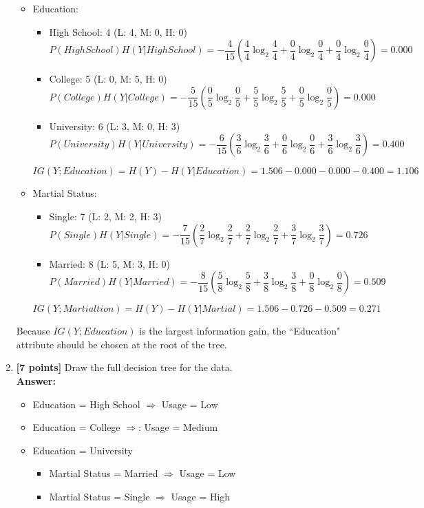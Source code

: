 \begin{enumerate}
\begin{itemize}
	\item Education:
	\begin{itemize}
		\item High School: 4 (L: 4, M: 0, H: 0)
		$$P(High School)H(Y|High School)=-\frac{4}{15}(\frac{4}{4}\log_2\frac{4}{4}+\frac{0}{4}\log_2\frac{0}{4}+\frac{0}{4}\log_2\frac{0}{4})=0.000$$
		\item College: 5 (L: 0, M: 5, H: 0)
		$$P(College)H(Y|College)=-\frac{5}{15}(\frac{0}{5}\log_2\frac{0}{5}+\frac{5}{5}\log_2\frac{5}{5}+\frac{0}{5}\log_2\frac{0}{5})=0.000$$
		\item University: 6 (L: 3, M: 0, H: 3)
		$$P(University)H(Y|University)=-\frac{6}{15}(\frac{3}{6}\log_2\frac{3}{6}+\frac{0}{6}\log_2\frac{0}{6}+\frac{3}{6}\log_2\frac{3}{6})=0.400$$
	\end{itemize}
	$$IG(Y;Education)=H(Y)-H(Y|Education)=1.506-0.000-0.000-0.400=1.106$$
	\item Martial Status:
	\begin{itemize}
		\item Single: 7 (L: 2, M: 2, H: 3)
		$$P(Single)H(Y|Single)=-\frac{7}{15}(\frac{2}{7}\log_2\frac{2}{7}+\frac{2}{7}\log_2\frac{2}{7}+\frac{3}{7}\log_2\frac{3}{7})=0.726$$
		\item Married: 8 (L: 5, M: 3, H: 0)
		$$P(Married)H(Y|Married)=-\frac{8}{15}(\frac{5}{8}\log_2\frac{5}{8}+\frac{3}{8}\log_2\frac{3}{8}+\frac{0}{8}\log_2\frac{0}{8})=0.509$$
	\end{itemize}
	$$IG(Y;Martialtion)=H(Y)-H(Y|Martial)=1.506-0.726-0.509=0.271$$
\end{itemize}
Because $IG(Y;Education)$ is the largest information gain, the ``Education" attribute should be chosen at the root of the tree.

\item\textbf{[7 points]} Draw the full decision tree for the data.
\\\textbf{Answer:}\\
\begin{itemize}
	\item Education = High School $\Rightarrow$ Usage = Low
	\item Education = College $\Rightarrow$: Usage = Medium
	\item Education = University
	\begin{itemize}
		\item Martial Status = Married $\Rightarrow$ Usage = Low
		\item Martial Status = Single $\Rightarrow$ Usage = High
	\end{itemize}
\end{itemize}

\end{enumerate}


